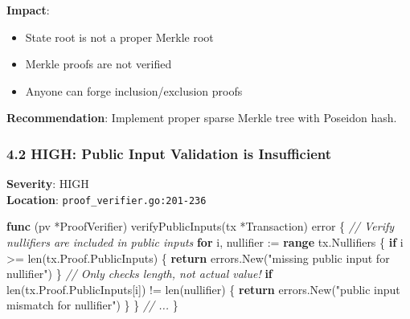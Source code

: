 \documentclass[
]{article}
\newenvironment{Shaded}{}{}
\newcommand{\BuiltInTok}[1]{\textcolor[rgb]{0.00,0.50,0.00}{#1}}
\newcommand{\CommentTok}[1]{\textcolor[rgb]{0.38,0.63,0.69}{\textit{#1}}}
\newcommand{\ControlFlowTok}[1]{\textcolor[rgb]{0.00,0.44,0.13}{\textbf{#1}}}
\newcommand{\DataTypeTok}[1]{\textcolor[rgb]{0.56,0.13,0.00}{#1}}
\newcommand{\KeywordTok}[1]{\textcolor[rgb]{0.00,0.44,0.13}{\textbf{#1}}}
\newcommand{\NormalTok}[1]{#1}
\newcommand{\OperatorTok}[1]{\textcolor[rgb]{0.40,0.40,0.40}{#1}}
\newcommand{\StringTok}[1]{\textcolor[rgb]{0.25,0.44,0.63}{#1}}
\providecommand{\tightlist}{%
  \setlength{\itemsep}{0pt}\setlength{\parskip}{0pt}}
\begin{document}
\textbf{Impact}:

\begin{itemize}
\tightlist
\item
  State root is not a proper Merkle root
\item
  Merkle proofs are not verified
\item
  Anyone can forge inclusion/exclusion proofs
\end{itemize}

\textbf{Recommendation}: Implement proper sparse Merkle tree with
Poseidon hash.

\subsubsection{4.2 HIGH: Public Input Validation is
Insufficient}\label{42-high-public-input-validation-is-insufficient}

\textbf{Severity}: HIGH\\
\textbf{Location}: \texttt{proof\_verifier.go:201-236}

\begin{Shaded}
\begin{Highlighting}[]
\KeywordTok{func} \OperatorTok{(}\NormalTok{pv }\OperatorTok{*}\NormalTok{ProofVerifier}\OperatorTok{)}\NormalTok{ verifyPublicInputs}\OperatorTok{(}\NormalTok{tx }\OperatorTok{*}\NormalTok{Transaction}\OperatorTok{)} \DataTypeTok{error} \OperatorTok{\{}
    \CommentTok{// Verify nullifiers are included in public inputs}
    \ControlFlowTok{for}\NormalTok{ i}\OperatorTok{,}\NormalTok{ nullifier }\OperatorTok{:=} \KeywordTok{range}\NormalTok{ tx}\OperatorTok{.}\NormalTok{Nullifiers }\OperatorTok{\{}
        \ControlFlowTok{if}\NormalTok{ i }\OperatorTok{\textgreater{}=} \BuiltInTok{len}\OperatorTok{(}\NormalTok{tx}\OperatorTok{.}\NormalTok{Proof}\OperatorTok{.}\NormalTok{PublicInputs}\OperatorTok{)} \OperatorTok{\{}
            \ControlFlowTok{return}\NormalTok{ errors}\OperatorTok{.}\NormalTok{New}\OperatorTok{(}\StringTok{"missing public input for nullifier"}\OperatorTok{)}
        \OperatorTok{\}}
        \CommentTok{// Only checks length, not actual value!}
        \ControlFlowTok{if} \BuiltInTok{len}\OperatorTok{(}\NormalTok{tx}\OperatorTok{.}\NormalTok{Proof}\OperatorTok{.}\NormalTok{PublicInputs}\OperatorTok{[}\NormalTok{i}\OperatorTok{])} \OperatorTok{!=} \BuiltInTok{len}\OperatorTok{(}\NormalTok{nullifier}\OperatorTok{)} \OperatorTok{\{}
            \ControlFlowTok{return}\NormalTok{ errors}\OperatorTok{.}\NormalTok{New}\OperatorTok{(}\StringTok{"public input mismatch for nullifier"}\OperatorTok{)}
        \OperatorTok{\}}
    \OperatorTok{\}}
    \CommentTok{// ...}
\OperatorTok{\}}
\end{Highlighting}
\end{Shaded}
\end{document}
